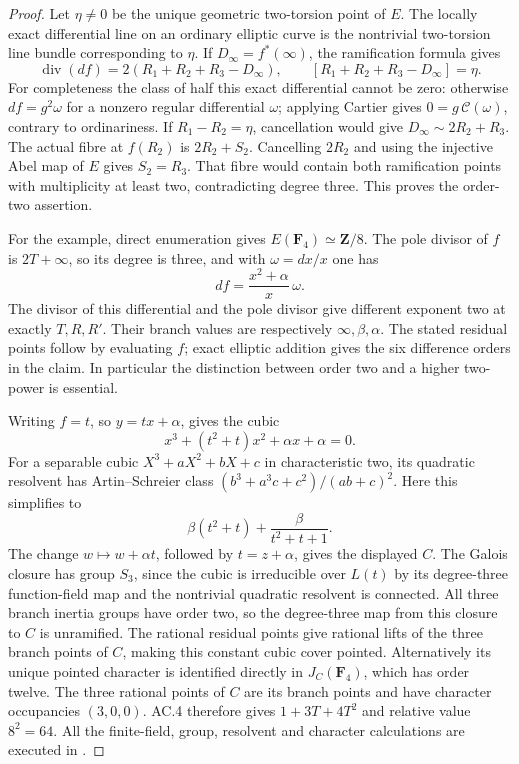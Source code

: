 \begin{proof}
Let \(\eta\ne0\) be the unique geometric two-torsion point of
\(E\). The locally exact differential line on an ordinary
elliptic curve is the nontrivial two-torsion line bundle
corresponding to \(\eta\).
If \(D_\infty=f^*(\infty)\), the ramification formula gives
\[
 \operatorname{div}(df)
        =2(R_1+R_2+R_3-D_\infty),\qquad
 [R_1+R_2+R_3-D_\infty]=\eta.
\]
For completeness the class of half this exact differential
cannot be zero: otherwise \(df=g^2\omega\) for a nonzero
regular differential \(\omega\); applying Cartier gives
\(0=g\,\mathcal C(\omega)\), contrary to ordinariness.
If \(R_1-R_2=\eta\), cancellation would give
\(D_\infty\sim2R_2+R_3\).
The actual fibre at \(f(R_2)\) is \(2R_2+S_2\).
Cancelling \(2R_2\) and using the injective Abel map of \(E\)
gives \(S_2=R_3\). That fibre would contain both ramification
points with multiplicity at least two, contradicting degree
three. This proves the order-two assertion.

For the example, direct enumeration gives
\(E(\mathbf F_4)\simeq\mathbf Z/8\).
The pole divisor of \(f\) is \(2T+\infty\), so its degree is
three, and with \(\omega=dx/x\) one has
\[
                        df=\frac{x^2+\alpha}{x}\,\omega.
\]
The divisor of this differential and the pole divisor give
different exponent two at exactly \(T,R,R'\).
Their branch values are respectively \(\infty,\beta,\alpha\).
The stated residual points follow by evaluating \(f\);
exact elliptic addition gives the six difference orders in
the claim. In particular the distinction between order two
and a higher two-power is essential.

Writing \(f=t\), so \(y=tx+\alpha\), gives the cubic
\[
                x^3+(t^2+t)x^2+\alpha x+\alpha=0.
\]
For a separable cubic \(X^3+aX^2+bX+c\) in characteristic two,
its quadratic resolvent has Artin--Schreier class
\((b^3+a^3c+c^2)/(ab+c)^2\).
Here this simplifies to
\[
              \beta(t^2+t)+\frac{\beta}{t^2+t+1}.
\]
The change \(w\mapsto w+\alpha t\), followed by \(t=z+\alpha\),
gives the displayed \(C\).
The Galois closure has group \(S_3\), since the cubic is
irreducible over \(L(t)\) by its degree-three function-field
map and the nontrivial quadratic resolvent is connected.
All three branch inertia groups have order two, so the
degree-three map from this closure to \(C\) is unramified.
The rational residual points give rational lifts of the three
branch points of \(C\), making this constant cubic cover
pointed. Alternatively its unique pointed character is
identified directly in \(J_C(\mathbf F_4)\), which has order
twelve. The three rational points of \(C\) are its branch
points and have character occupancies \((3,0,0)\).
AC.4 therefore gives \(1+3T+4T^2\) and relative value
\(8^2=64\). All the finite-field, group, resolvent and
character calculations are executed in
.


\end{proof}
